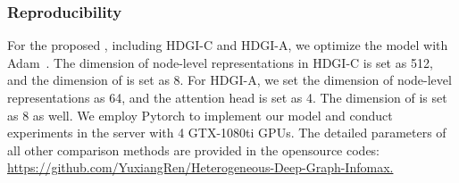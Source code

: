 \documentclass[conference]{IEEEtran}
\begin{document}
	
	\subsubsection{Reproducibility}
	For the proposed {\our}, including HDGI-C and HDGI-A, we optimize the model with Adam~\cite{KB15}. The dimension of node-level representations in HDGI-C is set as 512, and the dimension of  is set as 8. For HDGI-A, we set the dimension of node-level representations as 64, and the attention head is set as 4. The dimension of  is set as 8 as well. We employ Pytorch to implement our model and conduct experiments in the server with 4 GTX-1080ti GPUs. The detailed parameters of all other comparison methods are provided in the opensource codes:
	\href{https://github.com/YuxiangRen/Heterogeneous-Deep-Graph-Infomax}{https://github.com/YuxiangRen/Heterogeneous-Deep-Graph-Infomax.}  
	
\end{document}
